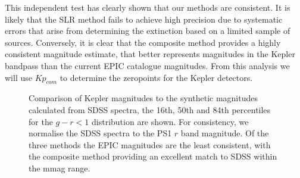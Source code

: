 \documentclass{aastex63}
\begin{document}
This independent test has clearly shown that our methods are consistent. It is likely that the SLR method fails to achieve high precision due to systematic errors that arise from determining the extinction based on a limited sample of sources. Conversely, it is clear that the composite method provides a highly consistent magnitude estimate, that better represents magnitudes in the Kepler bandpass than the current EPIC catalogue magnitudes. From this analysis we will use $Kp_{com}$ to determine the zeropoints for the Kepler detectors. 



\begin{figure}
    \caption{Comparison of Kepler magnitudes to the synthetic magnitudes calculated from SDSS spectra, the 16th, 50th and 84th percentiles for the $g-r<1$ distribution are shown. For consistency, we normalise the SDSS spectra to the PS1 $r$ band magnitude. Of the three methods the EPIC magnitudes are the least consistent, with the composite method providing an excellent match to SDSS within the mmag range.}
    \label{fig:sdss_comparison}
\end{figure}


\end{document}
